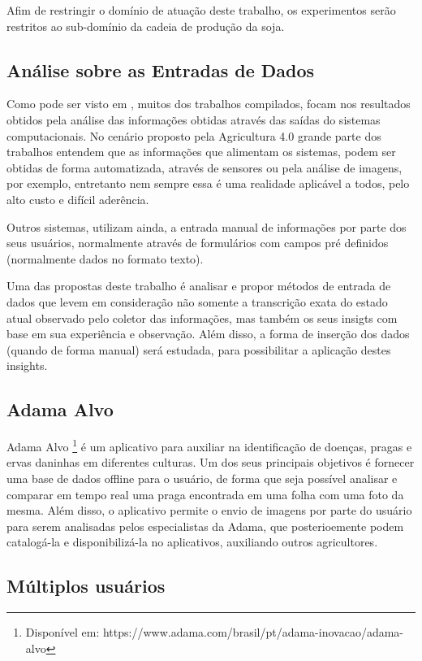 \documentclass[12pt]{article}
\begin{document}
Afim de restringir o domínio de atuação deste trabalho, os experimentos serão restritos ao sub-domínio da cadeia de produção da soja.

\subsection{Análise sobre as Entradas de Dados}

Como pode ser visto em \cite{rumo-agricultura-digital}, muitos dos trabalhos compilados, focam nos resultados obtidos pela análise das informações obtidas através das saídas do sistemas computacionais. No cenário proposto pela Agricultura 4.0 grande parte dos trabalhos entendem que as informações que alimentam os sistemas, podem ser obtidas de forma automatizada, através de sensores ou pela análise de imagens, por exemplo, entretanto nem sempre essa é uma realidade aplicável a todos, pelo alto custo e difícil aderência.

Outros sistemas, utilizam ainda, a entrada manual de informações por parte dos seus usuários, normalmente através de formulários com campos pré definidos (normalmente dados no formato texto).

Uma das propostas deste trabalho é analisar e propor métodos de entrada de dados que levem em consideração não somente a transcrição exata do estado atual observado pelo coletor das informações, mas também os seus insigts com base em sua experiência e observação. Além disso, a forma de inserção dos dados (quando de forma manual) será estudada, para possibilitar a aplicação destes insights.

\subsection{Adama Alvo}

Adama Alvo \footnote{Disponível em: https://www.adama.com/brasil/pt/adama-inovacao/adama-alvo} é um aplicativo para auxiliar na identificação de doenças, pragas e ervas daninhas em diferentes culturas. Um dos seus principais objetivos é fornecer uma base de dados offline para o usuário, de forma que seja possível analisar e comparar em tempo real uma praga encontrada em uma folha com uma foto da mesma. Além disso,  o aplicativo permite o envio de imagens por parte do usuário para serem analisadas pelos especialistas da Adama, que posterioemente podem catalogá-la e disponibilizá-la no aplicativos, auxiliando outros agricultores.

\subsection{Múltiplos usuários}
\end{document}

